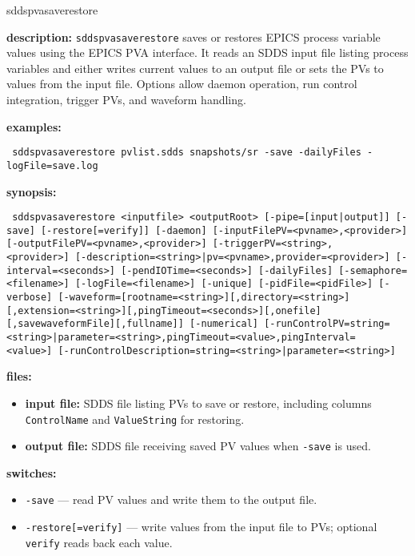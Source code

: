 \begin{sddsprog}{sddspvasaverestore}
\item \textbf{description:}
  \verb+sddspvasaverestore+ saves or restores EPICS process variable values using the EPICS PVA
  interface. It reads an SDDS input file listing process variables and either writes current
  values to an output file or sets the PVs to values from the input file. Options allow daemon
  operation, run control integration, trigger PVs, and waveform handling.
\item \textbf{examples:}
\begin{flushleft}{\tt
sddspvasaverestore pvlist.sdds snapshots/sr -save -dailyFiles -logFile=save.log\\
}\end{flushleft}
\item \textbf{synopsis:}
\begin{flushleft}{\tt
sddspvasaverestore <inputfile> <outputRoot> [-pipe=[input|output]]\
  [-save] [-restore[=verify]]\
  [-daemon]\
    [-inputFilePV=<pvname>,<provider>] [-outputFilePV=<pvname>,<provider>]\
    [-triggerPV=<string>,<provider>]\
    [-description=<string>|pv=<pvname>,provider=<provider>]\
  [-interval=<seconds>] [-pendIOTime=<seconds>]\
  [-dailyFiles] [-semaphore=<filename>] [-logFile=<filename>]\
  [-unique] [-pidFile=<pidFile>] [-verbose]\
  [-waveform=[rootname=<string>][,directory=<string>][,extension=<string>][,pingTimeout=<seconds>][,onefile][,savewaveformFile][,fullname]]\
  [-numerical]\
  [-runControlPV={string=<string>|parameter=<string>},pingTimeout=<value>,pingInterval=<value>]\
  [-runControlDescription={string=<string>|parameter=<string>}]
}\end{flushleft}
\item \textbf{files:}
  \begin{itemize}
  \item \textbf{input file:} SDDS file listing PVs to save or restore, including columns \verb|ControlName| and \verb|ValueString| for restoring.
  \item \textbf{output file:} SDDS file receiving saved PV values when \texttt{-save} is used.
  \end{itemize}
\item \textbf{switches:}
  \begin{itemize}
  \item {\tt -save} --- read PV values and write them to the output file.
  \item {\tt -restore[=verify]} --- write values from the input file to PVs; optional {\tt verify} reads back each value.

\end{itemize}
\end{sddsprog}
